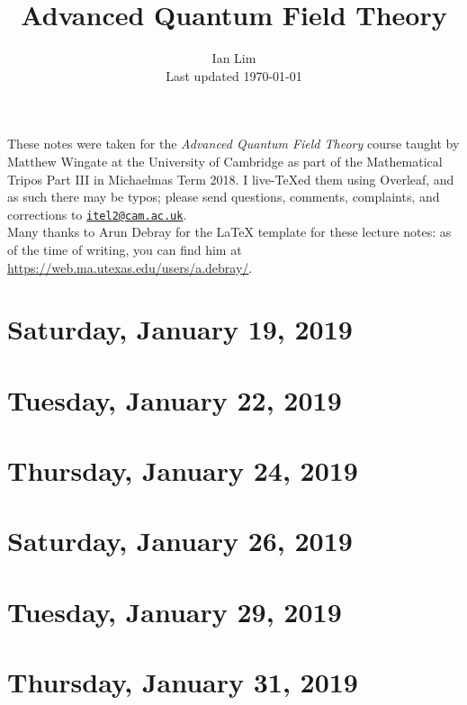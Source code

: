 \documentclass[reqno]{amsart}
\begin{document}
\title{Advanced Quantum Field Theory}
\author{Ian Lim\\ Last updated \today}
\maketitle
{\small\noindent These notes were taken for the \textit{Advanced Quantum Field Theory} course taught by Matthew Wingate at the University of Cambridge as part of the Mathematical Tripos Part III in Michaelmas Term 2018. I live-\TeX ed them using Overleaf, and as such there may be typos; please send questions, comments, complaints, and corrections to 
\href{mailto:itel2@cam.ac.uk?subject=AQFT\%20Lecture\%20Notes}{\texttt{itel2@cam.ac.uk}}.\\
Many thanks to Arun Debray for the {\LaTeX} template for these lecture notes: as of the time of writing, you can find him at \url{https://web.ma.utexas.edu/users/a.debray/}.}

\tableofcontents

\section{Saturday, January 19, 2019}
	

\section{Tuesday, January 22, 2019}
	

\section{Thursday, January 24, 2019}
    
    
\section{Saturday, January 26, 2019}
    

\section{Tuesday, January 29, 2019}
    

\section{Thursday, January 31, 2019}
    
\end{document}

